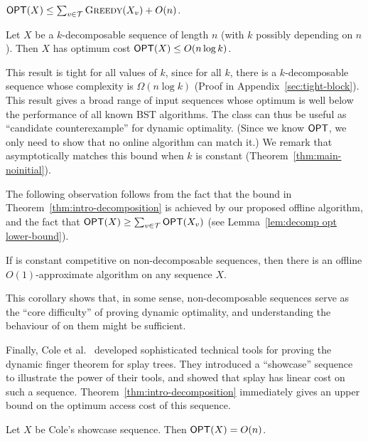 \begin{theorem}
\label{thm:intro-decomposition} 
$\mbox{\sf OPT}(X) \leq \sum_{v \in {\mathcal T}} \textsc{Greedy}(X_v) + O(n) $.
\end{theorem} 

 
\begin{corollary} 
\label{cor:rgreedy-good}
Let $X$ be a $k$-decomposable sequence of length $n$ (with $k$ possibly depending on $n$). Then $X$ has optimum cost $\mbox{\sf OPT}(X) \leq O(n \log k)$.
\end{corollary} 

This result is tight for all values of $k$, since for all $k$, there is a $k$-decomposable sequence whose complexity is $\Omega(n \log k)$ (Proof in Appendix~\ref{sec:tight-block}). 
This result gives a broad range of input sequences whose optimum is well below the performance of all known BST algorithms. The class can thus be useful as ``candidate counterexample'' for dynamic optimality. (Since we know $\mbox{\sf OPT}$, we only need to show that no online algorithm can match it.) 
We remark that \greedy asymptotically matches this bound when $k$ is constant (Theorem~\ref{thm:main-noinitial}).


The following observation follows from the fact that the bound in Theorem~\ref{thm:intro-decomposition} is achieved by our proposed offline algorithm, and the fact that $\mbox{\sf OPT}(X) \geq \sum_{v \in {\mathcal T}} \mbox{\sf OPT}(X_v)$ (see Lemma~\ref{lem:decomp opt lower-bound}).

\begin{corollary}
If \greedy is constant competitive on non-decomposable sequences, then there is an offline $O(1)$-approximate algorithm on any sequence $X$.
\end{corollary} 

This corollary shows that, in some sense, non-decomposable sequences serve as the ``core difficulty'' of proving dynamic optimality, and understanding the behaviour of \greedy on them might be sufficient.

Finally, Cole et al.~\cite{finger1} developed sophisticated technical tools for proving the dynamic finger theorem for splay trees. 
They introduced a ``showcase'' sequence to illustrate the power of their tools, and showed that splay has linear cost on such a sequence. 
Theorem~\ref{thm:intro-decomposition} immediately gives an upper bound on the optimum access cost of this sequence. 

\begin{corollary} [informal] 
Let $X$ be Cole's showcase sequence. Then $\mbox{\sf OPT}(X) = O(n)$. 
\end{corollary}   



